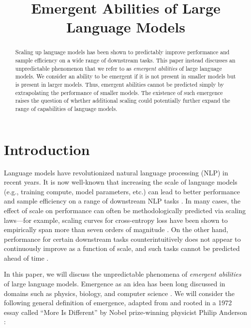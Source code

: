 \title{Emergent Abilities of Large Language Models}

\begin{abstract}
Scaling up language models has been shown to predictably improve performance and sample efficiency on a wide range of downstream tasks. This paper instead discusses an unpredictable phenomenon that we refer to as \emph{emergent abilities} of large language models. We consider an ability to be emergent if it is not present in smaller models but is present in larger models. Thus, emergent abilities cannot be predicted simply by extrapolating the performance of smaller models. The existence of such emergence raises the question of whether additional scaling could potentially further expand the range of capabilities of language models.
\end{abstract}

\section{Introduction}

Language models have revolutionized natural language processing (NLP) in recent years. It is now well-known that increasing the scale of language models (e.g., training compute, model parameters, etc.) can lead to better performance and sample efficiency on a range of downstream NLP tasks \citep[][\textit{inter alia}]{devlin-etal-2019-bert,brown2020language}. In many cases, the effect of scale on performance can often be methodologically predicted via scaling laws---for example, scaling curves for cross-entropy loss have been shown to empirically span more than seven orders of magnitude \citep{kaplan2020scaling,hoffmann2022training}. On the other hand, performance for certain downstream tasks counterintuitively does not appear to continuously improve as a function of scale, and such tasks cannot be predicted ahead of time \citep{ganguli2022predictability}.

In this paper, we will discuss the unpredictable phenomena of \textit{emergent abilities} of large language models. Emergence as an idea has been long discussed in domains such as physics, biology, and computer science \citep[][\textit{inter alia}]{anderson1972more,hwang2012emergent,forrest1990emergent,corradini2010emergence,harper2012new}. We will consider the following general definition of emergence, adapted from \citet{jacobsdefinition} and rooted in a 1972 essay called ``More Is Different'' by Nobel prize-winning physicist Philip Anderson \citep{anderson1972more}:

